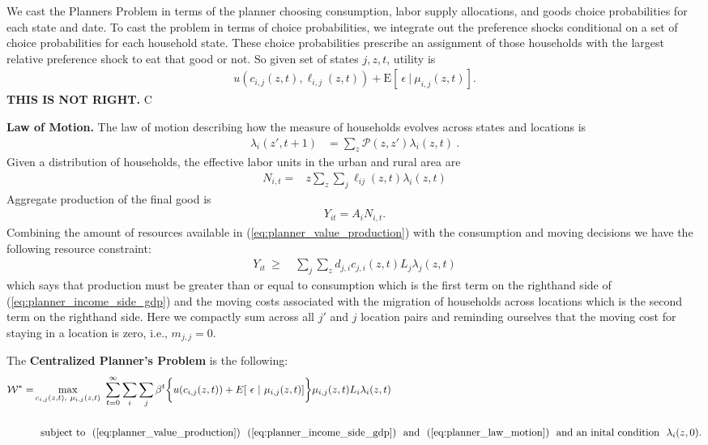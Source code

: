 \documentclass[12pt,pdftex]{article}
\begin{document}
\begin{onehalfspacing}
We cast the Planners Problem in terms of the planner choosing consumption, labor supply allocations, and goods choice probabilities for each state and date. To cast the problem in terms of choice probabilities, we integrate out the preference shocks conditional on a set of choice probabilities for each household state. These choice probabilities prescribe an assignment of those households with the largest relative preference shock to eat that good or not. So given set of states $j, z, t$, utility is
\begin{align}
u(c_{i,j}(z, t), \ell_{i,j}(z, t) ) + \mathrm{E}[ \ \epsilon \ | \ \mu_{i,j}(z,t) ].
\label{eq:utility-shocks}
\end{align}
\textbf{THIS IS NOT RIGHT.} C

\textbf{Law of Motion.} The law of motion describing how the measure of households evolves across states and locations is
\begin{align}
\lambda_{i}(z', t+1)  & =   \sum_{z} \mathcal{P}(z, z') \lambda_{i}(z,  t)  \  \label{eq:planner_law_motion} .
\end{align}
Given a distribution of households, the effective labor units in the urban and rural area are
\begin{align}
N_{i,t} =& z \sum_{z} \sum_{j} \ell_{ij}(z, t) \lambda_{i}(z, t)\nonumber
\end{align}
Aggregate production of the final good is
\begin{align}
Y_{it} = A_i N_{i,t} .
\label{eq:planner_value_production}
\end{align}
Combining the amount of resources available in (\ref{eq:planner_value_production}) with the consumption and moving decisions we have the following resource constraint:
\begin{align}
Y_{it}\  \geq \ & \sum_{j} \sum_{z} d_{j,i} c_{j,i}(z, t) L_{j}\lambda_{j}(z, t)
\end{align}
which says that production must be greater than or equal to consumption which is the first term on the righthand side of (\ref{eq:planner_income_side_gdp}) and the moving costs associated with the migration of households across locations which is the second term on the righthand side. Here we compactly sum across all $j'$ and $j$ location pairs and reminding ourselves that the moving cost for staying in a location is zero, i.e., $m_{j,j} = 0$.

The \textbf{Centralized Planner's Problem} is the following:
{\small
\begin{align}
\mathcal{W}^{*} = & \max\limits_{c_{i,j}(z, t),\ \mu_{i,j}(z, t)} \ \sum_{t=0}^{\infty}\sum_{i} \sum_{j} \beta^{t} \bigg \{ u(c_{i,j}(z, t)) + E[ \ \epsilon \ | \ \mu_{i,j}(z,t)]  \bigg \} \mu_{i,j}(z,t) L_{i}\lambda_{i}(z, t) \ \ \nonumber \\
\nonumber \\
& \ \ \mbox{subject to} \ \ (\ref{eq:planner_value_production}) \ \ (\ref{eq:planner_income_side_gdp}) \ \ \mbox{and} \ \ (\ref{eq:planner_law_motion}) \ \ \mbox{and an inital condition} \ \ \lambda_i(z, 0).
\label{eq:planner_problem}
\end{align}}


\end{onehalfspacing}
\end{document}
